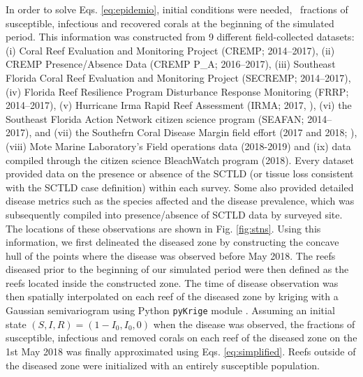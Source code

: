 In order to solve Eqs. \ref{eq:epidemio}, initial conditions were needed, \ie~fractions of susceptible, infectious and recovered corals at the beginning of the simulated period. This information was constructed from 9 different field-collected datasets: (i) Coral Reef Evaluation and Monitoring Project (CREMP; 2014–2017), (ii) CREMP Presence/Absence Data (CREMP P\_A; 2016–2017), (iii) Southeast Florida Coral Reef Evaluation and Monitoring Project (SECREMP; 2014–2017), (iv) Florida Reef Resilience Program Disturbance Response Monitoring (FRRP; 2014–2017), (v) Hurricane Irma Rapid Reef Assessment (IRMA; 2017, \cite{viehman2018}), (vi) the Southeast Florida Action Network citizen science program (SEAFAN; 2014–2017), and (vii) the Southefrn Coral Disease Margin field effort (2017 and 2018; \cite{neely2018surveying}), (viii) Mote Marine Laboratory’s Field operations data (2018-2019) and (ix) data compiled through the citizen science BleachWatch program (2018). Every dataset provided data on the presence or absence of the SCTLD (or tissue loss consistent with the SCTLD case definition) within each survey. Some also provided detailed disease metrics such as the species affected and the disease prevalence, which was subsequently compiled into presence/absence of SCTLD data by surveyed site. The locations of these observations are shown in Fig. \ref{fig:stns}. Using this information, we first delineated the diseased zone by constructing the concave hull of the points where the disease was observed before May 2018. The reefs diseased prior to the beginning of our simulated period were then defined as the reefs located inside the constructed zone. The time of disease observation was then spatially interpolated on each reef of the diseased zone by kriging with a Gaussian semivariogram using Python \texttt{pyKrige} module \citep{murphy2014pykrige}. Assuming an initial state $(S,I,R)=(1-I_0, I_0, 0)$ when the disease was observed, the fractions of susceptible, infectious and removed corals on each reef of the diseased zone on the 1st May 2018 was finally approximated using Eqs. \ref{eq:simplified}. Reefs outside of the diseased zone were initialized with an entirely susceptible population.  

